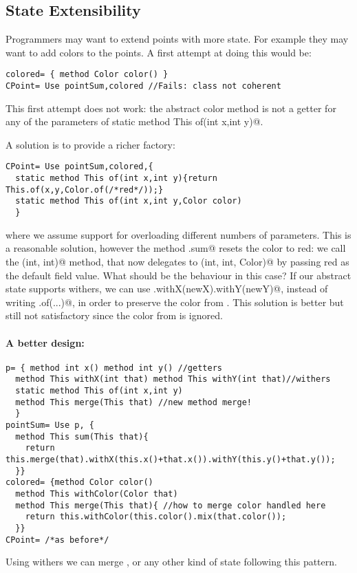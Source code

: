 \subsection{State Extensibility}
Programmers may want to extend points with more state. For example 
they may want to add colors to the points. A first attempt at doing
this would be:
\saveSpace\saveSpace
\begin{lstlisting}
colored= { method Color color() }
CPoint= Use pointSum,colored //Fails: class not coherent
\end{lstlisting}
\saveSpace\saveSpace 
This first attempt does not work: the abstract color method
is not a getter for any of the parameters of 
\Q@ static method This of(int x,int y)@. 

\noindent
A solution is to provide a richer factory:
\saveSpace\saveSpace 
\begin{lstlisting}
CPoint= Use pointSum,colored,{
  static method This of(int x,int y){return This.of(x,y,Color.of(/*red*/));}
  static method This of(int x,int y,Color color)
  }
\end{lstlisting}
\saveSpace\saveSpace 
\noindent 
where we assume support for overloading  different numbers of parameters.
This is a reasonable solution, however the method \Q@CPoint.sum@ resets
the color to red: we call the \Q@of(int, int)@ method, that now
delegates to \Q@of(int, int, Color)@ by passing red as the default field
value.  What should be the behaviour in this case?  If our abstract
state supports withers, we can use
\Q@this.withX(newX).withY(newY)@, instead of writing \Q@This.of(...)@, in order to preserve the color from
\Q@this@.  This solution is better but still not satisfactory since the color from \Q@that@ is ignored.

\paragraph{A better design:}
\saveSpace\saveSpace \begin{lstlisting}
p= { method int x() method int y() //getters
  method This withX(int that) method This withY(int that)//withers
  static method This of(int x,int y)
  method This merge(This that) //new method merge!
  }
pointSum= Use p, { 
  method This sum(This that){
    return this.merge(that).withX(this.x()+that.x()).withY(this.y()+that.y());
  }}
colored= {method Color color()
  method This withColor(Color that)
  method This merge(This that){ //how to merge color handled here
    return this.withColor(this.color().mix(that.color());
  }}
CPoint= /*as before*/
\end{lstlisting} \saveSpace\saveSpace 
  \noindent Using withers we can merge \Q@color@s, or any other kind of state 
  following this pattern.%

